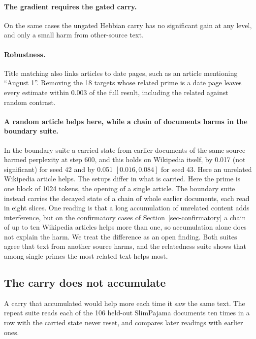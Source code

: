 \documentclass[12pt,a4paper]{report}
\begin{document}
\paragraph{The gradient requires the gated carry.} On the same cases the ungated Hebbian carry has no significant gain at any level, and only a small harm from other-source text.

\paragraph{Robustness.} Title matching also links articles to date pages, such as an article mentioning ``August 1''. Removing the 18 targets whose related prime is a date page leaves every estimate within 0.003 of the full result, including the related against random contrast.

\paragraph{A random article helps here, while a chain of documents harms in the boundary suite.} In the boundary suite a carried state from earlier documents of the same source harmed perplexity at step 600, and this holds on Wikipedia itself, by 0.017 (not significant) for seed 42 and by 0.051 $[0.016, 0.084]$ for seed 43. Here an unrelated Wikipedia article helps. The setups differ in what is carried. Here the prime is one block of 1024 tokens, the opening of a single article. The boundary suite instead carries the decayed state of a chain of whole earlier documents, each read in eight slices. One reading is that a long accumulation of unrelated content adds interference, but on the confirmatory cases of Section~\ref{sec-confirmatory} a chain of up to ten Wikipedia articles helps more than one, so accumulation alone does not explain the harm. We treat the difference as an open finding. Both suites agree that text from another source harms, and the relatedness suite shows that among single primes the most related text helps most.

\subsection{The carry does not accumulate}

A carry that accumulated would help more each time it saw the same text. The repeat suite reads each of the 106 held-out SlimPajama documents ten times in a row with the carried state never reset, and compares later readings with earlier ones.
\end{document}
